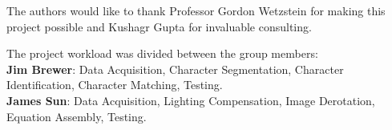 \documentclass[journal]{IEEEtran}
\begin{document}
The authors would like to thank Professor Gordon Wetzstein for making this project possible and Kushagr Gupta for invaluable consulting.

\appendix[]
The project workload was divided between the group members:\\
\textbf{Jim Brewer}: Data Acquisition, Character Segmentation, Character Identification, Character Matching, Testing.\\
\textbf{James Sun}: Data Acquisition, Lighting Compensation, Image Derotation, Equation Assembly, Testing.



%
%
%


\end{document}
